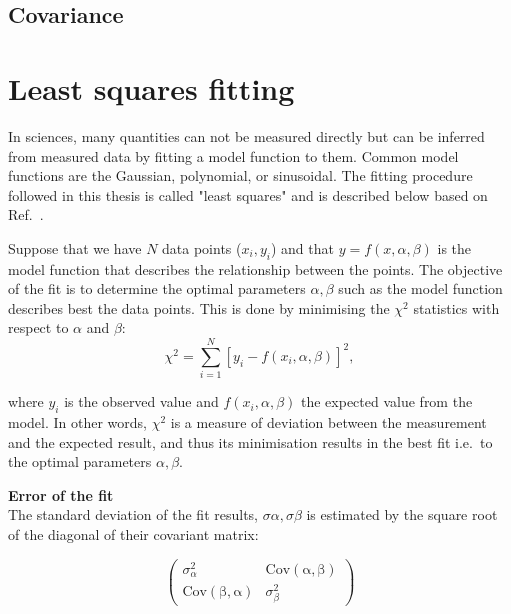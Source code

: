 

\subsection{Covariance}

\section{Least squares fitting}\label{app:non_linear_fitting}
In sciences, many quantities can not be measured directly but can be inferred from measured data by fitting a model function to them. Common model functions are the Gaussian, polynomial, or sinusoidal. The fitting procedure followed in this thesis is called "least squares" and is described below based on Ref.~\cite{least_square_minimisation}.

Suppose that we have $N$ data points ($x_{i}, y_{i}$) and that $y=f(x,\alpha, \beta)$ is the model function that describes the relationship between the points. The objective of the fit is to determine the optimal parameters $\alpha, \beta$ such as the model function describes best the data points. This is done by minimising the $\chi^2$ statistics with respect to $\alpha$ and $\beta$:
\begin{equation}\label{eq:chi_square}
    \chi^2 = \sum_{i=1}^{N}[y_{i}-f(x_{i},\alpha, \beta)]^2,
\end{equation}

where $y_{i}$ is the observed value and $f(x_{i},\alpha, \beta)$ the expected value from the model. In other words, $\chi^2$ is a measure of deviation between the measurement and the expected result, and thus its minimisation results in the best fit i.e.\ to the optimal parameters $\alpha, \beta$.


\normalsize{\textbf{Error of the fit}}\\
The standard deviation of the fit results, $\sigma \alpha, \sigma \beta$ is estimated by the square root of the diagonal of their covariant matrix:

\begin{equation}\label{eq:cov_matrix_fit_results}
    \begin{pmatrix}
        \sigma_{\alpha}^2 & \mathrm{Cov(\alpha, \beta)}\\
        \mathrm{Cov(\beta, \alpha)} & \sigma_{\beta}^2
        \end{pmatrix}
\end{equation}

